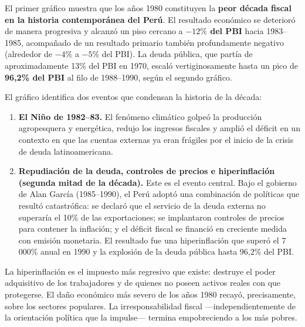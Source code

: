 \documentclass[12pt, a4paper]{article}
\newcommand{\emp}[1]{\textbf{#1}}
\begin{document}
El primer gráfico muestra que los años 1980 constituyen la \emp{peor década
fiscal en la historia contemporánea del Perú}. El resultado económico se
deterioró de manera progresiva y alcanzó un piso cercano a \emp{$-12\%$ del
PBI} hacia 1983--1985, acompañado de un resultado primario también
profundamente negativo (alrededor de $-4\%$ a $-5\%$ del PBI). La deuda
pública, que partía de aproximadamente 13\% del PBI en 1970, escaló
vertiginosamente hasta un pico de \emp{96{,}2\% del PBI} al filo de
1988--1990, según el segundo gráfico.

El gráfico identifica dos eventos que condensan la historia de la década:

\begin{enumerate}[leftmargin=1.5em]
    \item \emp{El Niño de 1982--83.} El fenómeno climático golpeó la producción
          agropesquera y energética, redujo los ingresos fiscales y amplió el
          déficit en un contexto en que las cuentas externas ya eran frágiles
          por el inicio de la crisis de deuda latinoamericana.

    \item \emp{Repudiación de la deuda, controles de precios e hiperinflación
          (segunda mitad de la década).} Este es el evento central. Bajo el
          gobierno de Alan García (1985--1990), el Perú adoptó una combinación
          de políticas que resultó catastrófica: se declaró que el servicio de
          la deuda externa no superaría el 10\% de las exportaciones; se
          implantaron controles de precios para contener la inflación; y el
          déficit fiscal se financió en creciente medida con emisión monetaria.
          El resultado fue una hiperinflación que superó el 7\,000\% anual
          en 1990 y la explosión de la deuda pública hasta 96{,}2\% del PBI.
\end{enumerate}

\begin{tcolorbox}[title={Un apunte para Tito Marx}]
La hiperinflación es el impuesto más regresivo que existe: destruye el poder
adquisitivo de los trabajadores y de quienes no poseen activos reales
con que protegerse. El daño económico más severo de los años 1980 recayó,
precisamente, sobre los sectores populares. La irresponsabilidad fiscal
---independientemente de la orientación política que la impulse--- termina
empobreciendo a los más pobres.
\end{tcolorbox}

\end{document}
